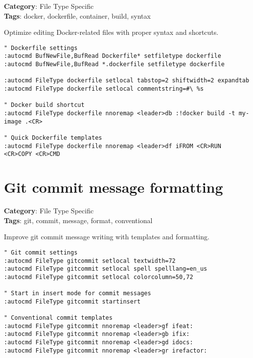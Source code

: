 {{{{{\textbf{Category}: File Type Specific\\ \textbf{Tags}: docker, dockerfile, container, build, syntax
\vspace{0.5cm}

Optimize editing Docker-related files with proper syntax and shortcuts.

\begin{Exa*}{}
\begin{Verbatim}[fontsize=\footnotesize, breaklines, breakanywhere]
" Dockerfile settings
:autocmd BufNewFile,BufRead Dockerfile* setfiletype dockerfile
:autocmd BufNewFile,BufRead *.dockerfile setfiletype dockerfile

:autocmd FileType dockerfile setlocal tabstop=2 shiftwidth=2 expandtab
:autocmd FileType dockerfile setlocal commentstring=#\ %s

" Docker build shortcut
:autocmd FileType dockerfile nnoremap <leader>db :!docker build -t my-image .<CR>

" Quick Dockerfile templates
:autocmd FileType dockerfile nnoremap <leader>df iFROM <CR>RUN <CR>COPY <CR>CMD 
\end{Verbatim}
\end{Exa*}

\section{Git commit message formatting}

\textbf{Category}: File Type Specific\\ \textbf{Tags}: git, commit, message, format, conventional
\vspace{0.5cm}

Improve git commit message writing with templates and formatting.

\begin{Exa*}{}
\begin{Verbatim}[fontsize=\footnotesize, breaklines, breakanywhere]
" Git commit settings
:autocmd FileType gitcommit setlocal textwidth=72
:autocmd FileType gitcommit setlocal spell spelllang=en_us
:autocmd FileType gitcommit setlocal colorcolumn=50,72

" Start in insert mode for commit messages
:autocmd FileType gitcommit startinsert

" Conventional commit templates
:autocmd FileType gitcommit nnoremap <leader>gf ifeat: 
:autocmd FileType gitcommit nnoremap <leader>gb ifix: 
:autocmd FileType gitcommit nnoremap <leader>gd idocs: 
:autocmd FileType gitcommit nnoremap <leader>gr irefactor: 
\end{Verbatim}
\end{Exa*}

}}}}}
